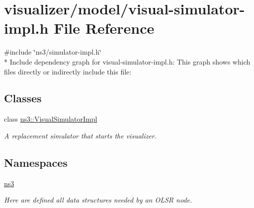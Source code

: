 \hypertarget{visual-simulator-impl_8h}{}\section{visualizer/model/visual-\/simulator-\/impl.h File Reference}
\label{visual-simulator-impl_8h}
{\ttfamily \#include \char`\"{}ns3/simulator-\/impl.\+h\char`\"{}}\\*
Include dependency graph for visual-\/simulator-\/impl.h\+:
This graph shows which files directly or indirectly include this file\+:
\subsection*{Classes}
\begin{DoxyCompactItemize}
\item 
class \hyperlink{classns3_1_1VisualSimulatorImpl}{ns3\+::\+Visual\+Simulator\+Impl}
\begin{DoxyCompactList}\small\item\em A replacement simulator that starts the visualizer. \end{DoxyCompactList}\end{DoxyCompactItemize}
\subsection*{Namespaces}
\begin{DoxyCompactItemize}
\item 
 \hyperlink{namespacens3}{ns3}
\begin{DoxyCompactList}\small\item\em Here are defined all data structures needed by an O\+L\+SR node. \end{DoxyCompactList}\end{DoxyCompactItemize}
